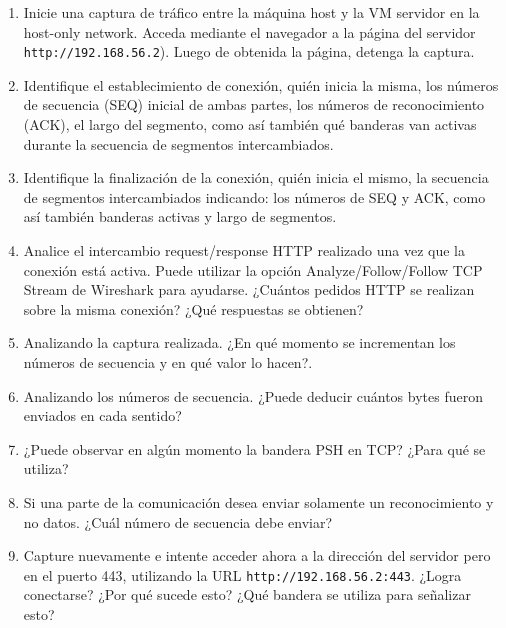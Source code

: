 \documentclass[a4paper,10pt]{article}
\begin{document}
\begin{enumerate}
    \item Inicie una captura de tráfico entre la máquina host y la VM servidor en la host-only network. Acceda mediante el navegador a la página del servidor \texttt{http://192.168.56.2}). Luego de obtenida la página, detenga la captura.
    
    \item Identifique el establecimiento de conexión, quién inicia la misma, los números de secuencia (SEQ) inicial de ambas partes, los números de reconocimiento (ACK), el largo del segmento, como así también qué banderas van activas durante la secuencia de segmentos intercambiados.
    
    \item Identifique la finalización de la conexión, quién inicia el mismo, la secuencia de segmentos intercambiados indicando: los números de SEQ y ACK, como así también banderas activas y largo de segmentos.
    
    \item Analice el intercambio request/response HTTP realizado una vez que la conexión está activa. Puede utilizar la opción Analyze/Follow/Follow TCP Stream de Wireshark para ayudarse. ¿Cuántos pedidos HTTP se realizan sobre la misma conexión? ¿Qué respuestas se obtienen?
    
    \item Analizando la captura realizada. ¿En qué momento se incrementan los números de secuencia y en qué valor lo hacen?.

    \item Analizando los números de secuencia. ¿Puede deducir cuántos bytes fueron enviados en cada sentido? 
    
    \item ¿Puede observar en algún momento la bandera PSH en TCP? ¿Para qué se utiliza?
    
    \item Si una parte de la comunicación desea enviar solamente un reconocimiento y no datos. ¿Cuál número de secuencia debe enviar?
    
    \item Capture nuevamente e intente acceder ahora a la dirección del servidor pero en el puerto 443, utilizando la URL \texttt{http://192.168.56.2:443}. ¿Logra conectarse? ¿Por qué sucede esto? ¿Qué bandera se utiliza para señalizar esto?

\end{enumerate}
\end{document}
